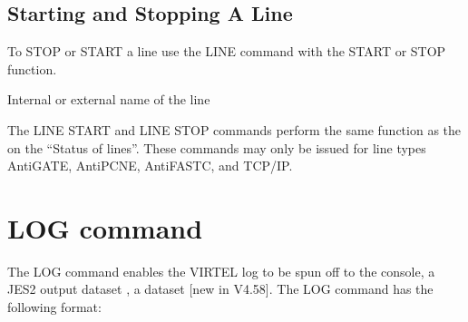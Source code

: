 \documentclass[letterpaper,10pt,english]{sphinxmanual}
\begin{document}
\ignorespaces 

\subsection{Starting and Stopping A Line}
\label{\detokenize{audit_operations_ and_performance:starting-and-stopping-a-line}}\label{\detokenize{audit_operations_ and_performance:index-7}}
\sphinxAtStartPar
To STOP or START a line use the LINE command with the START or STOP function.

\begin{sphinxVerbatim}[commandchars=\\\{\}]
  


  
\end{sphinxVerbatim}
\begin{description}
\sphinxAtStartPar
Internal or external name of the line

\end{description}

\sphinxAtStartPar
The LINE START and LINE STOP commands perform the same function as the {\hyperref[\detokenize{audit_operations_ and_performance:_bookmark12}]{}} on the “Status of lines”. These commands may only be issued for line types AntiGATE, AntiPCNE, AntiFASTC, and TCP/IP.

\ignorespaces 

\section{LOG command}
\label{\detokenize{audit_operations_ and_performance:log-command}}\label{\detokenize{audit_operations_ and_performance:index-8}}
\sphinxAtStartPar
The LOG command enables the VIRTEL log to be spun off to the console, a JES2 output dataset , a dataset {[}new in V4.58{]}. The LOG command has the following format:\sphinxhyphen{}

\begin{sphinxVerbatim}[commandchars=\\\{\}]
         
\end{sphinxVerbatim}
\end{document}
